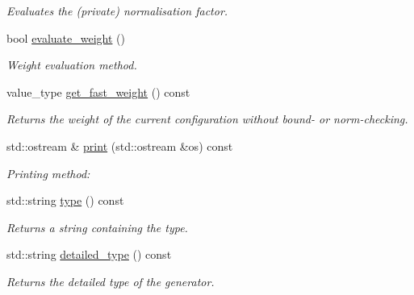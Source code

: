 \begin{DoxyCompactItemize}
\begin{DoxyCompactList}\small\item\em Evaluates the (private) normalisation factor. \end{DoxyCompactList}\item 
\hypertarget{a00128_a0ac06b1b9e344c70e7d0f04da5644df4}{}bool \hyperlink{a00128_a0ac06b1b9e344c70e7d0f04da5644df4}{evaluate\+\_\+weight} ()\label{a00128_a0ac06b1b9e344c70e7d0f04da5644df4}

\begin{DoxyCompactList}\small\item\em Weight evaluation method. \end{DoxyCompactList}\item 
value\+\_\+type \hyperlink{a00128_a1160e94fa42c3171f8ccadff9bff0955}{get\+\_\+fast\+\_\+weight} () const 
\begin{DoxyCompactList}\small\item\em Returns the weight of the current configuration without bound-\/ or norm-\/checking. \end{DoxyCompactList}\item 
\hypertarget{a00128_aeb51bdb0c15c3acf919462fb5691a027}{}std\+::ostream \& \hyperlink{a00128_aeb51bdb0c15c3acf919462fb5691a027}{print} (std\+::ostream \&os) const \label{a00128_aeb51bdb0c15c3acf919462fb5691a027}

\begin{DoxyCompactList}\small\item\em Printing method\+: \end{DoxyCompactList}\item 
\hypertarget{a00128_ad6b7d6fbe688e1d285c51205dcddb406}{}std\+::string \hyperlink{a00128_ad6b7d6fbe688e1d285c51205dcddb406}{type} () const \label{a00128_ad6b7d6fbe688e1d285c51205dcddb406}

\begin{DoxyCompactList}\small\item\em Returns a string containing the type. \end{DoxyCompactList}\item 
\hypertarget{a00128_afa20838a491521339328a69d847cb6f1}{}std\+::string \hyperlink{a00128_afa20838a491521339328a69d847cb6f1}{detailed\+\_\+type} () const \label{a00128_afa20838a491521339328a69d847cb6f1}

\begin{DoxyCompactList}\small\item\em Returns the detailed type of the generator. \end{DoxyCompactList}\end{DoxyCompactItemize}
